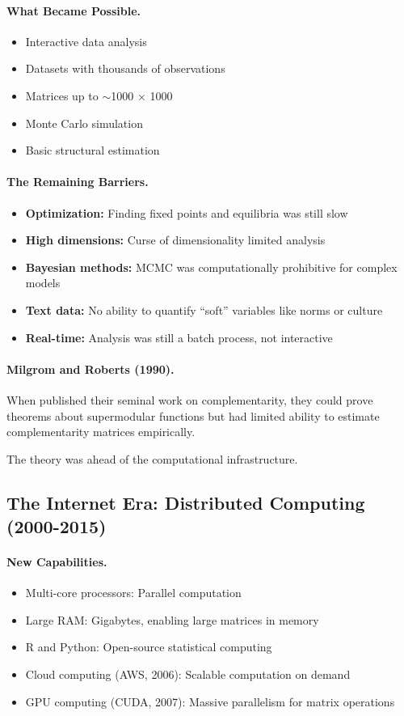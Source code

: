 \documentclass[12pt,a4paper]{article}
\begin{document}
\paragraph{What Became Possible.}
\begin{itemize}
  \item Interactive data analysis
  \item Datasets with thousands of observations
  \item Matrices up to $\sim$1000 $\times$ 1000
  \item Monte Carlo simulation
  \item Basic structural estimation
\end{itemize}

\paragraph{The Remaining Barriers.}
\begin{itemize}
  \item \textbf{Optimization:} Finding fixed points and equilibria was still slow
  \item \textbf{High dimensions:} Curse of dimensionality limited analysis
  \item \textbf{Bayesian methods:} MCMC was computationally prohibitive for complex models
  \item \textbf{Text data:} No ability to quantify ``soft'' variables like norms or culture
  \item \textbf{Real-time:} Analysis was still a batch process, not interactive
\end{itemize}

\paragraph{Milgrom and Roberts (1990).}
When \citet{milgromroberts1990} published their seminal work on complementarity,
they could prove theorems about supermodular functions but had limited
ability to estimate complementarity matrices empirically.

The theory was ahead of the computational infrastructure.

\subsection{The Internet Era: Distributed Computing (2000-2015)}

\paragraph{New Capabilities.}
\begin{itemize}
  \item Multi-core processors: Parallel computation
  \item Large RAM: Gigabytes, enabling large matrices in memory
  \item R and Python: Open-source statistical computing
  \item Cloud computing (AWS, 2006): Scalable computation on demand
  \item GPU computing (CUDA, 2007): Massive parallelism for matrix operations
\end{itemize}
\end{document}
